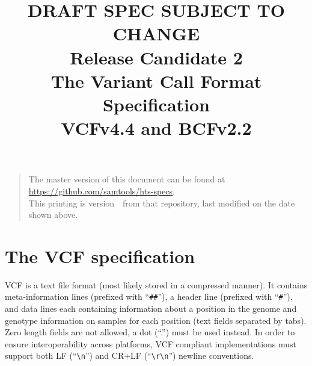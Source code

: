 \documentclass[8pt]{article}
\begin{document}

\title{\huge \color{red} DRAFT SPEC SUBJECT TO CHANGE \\ Release Candidate 2 \\ The Variant Call Format Specification \\ \vspace{0.5em} \large VCFv4.4 and BCFv2.2}
\date{\headdate}
\maketitle
\begin{quote}\small
The master version of this document can be found at \url{https://github.com/samtools/hts-specs}.\\
This printing is version~\commitdesc\ from that repository, last modified on the date shown above.
\end{quote}
\vspace*{1em}

\newpage
\tableofcontents
\newpage

\section{The VCF specification}
VCF is a text file format (most likely stored in a compressed manner).
It contains meta-information lines (prefixed with ``\verb|##|''), a header line (prefixed with ``\verb|#|''), and data lines each containing information about a position in the genome and genotype information on samples for each position (text fields separated by tabs).
Zero length fields are not allowed, a dot (``.'') must be used instead.
In order to ensure interoperability across platforms, VCF compliant implementations must support both LF (``\verb|\n|'') and CR+LF (``\verb|\r\n|'') newline conventions.
\end{document}
